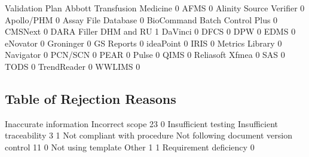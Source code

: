 \documentclass{article}
\begin{document}
\begin{Schunk}
\begin{Soutput}
                                Validation Plan
  Abbott Transfusion Medicine                 0
  AFMS                                        0
  Alinity Source Verifier                     0
  Apollo/PHM                                  0
  Assay File Database                         0
  BioCommand Batch Control Plus               0
  CMSNext                                     0
  DARA Filler DHM and RU                      1
  DaVinci                                     0
  DFCS                                        0
  DPW                                         0
  EDMS                                        0
  eNovator                                    0
  Groninger                                   0
  GS Reports                                  0
  ideaPoint                                   0
  IRIS                                        0
  Metrics Library                             0
  Navigator                                   0
  PCN/SCN                                     0
  PEAR                                        0
  Pulse                                       0
  QIMS                                        0
  Reliasoft Xfmea                             0
  SAS                                         0
  TODS                                        0
  TrendReader                                 0
  WWLIMS                                      0
\end{Soutput}
\end{Schunk}

\subsection{Table of Rejection Reasons}
\begin{Schunk}
\begin{Soutput}
                Inaccurate information                        Incorrect scope 
                                    23                                      0 
                  Insufficient testing              Insufficient traceability 
                                     3                                      1 
          Not compliant with procedure Not following document version control 
                                    11                                      0 
                    Not using template                                  Other 
                                     1                                      1 
                Requirement deficiency 
                                     0 
\end{Soutput}
\end{Schunk}
\end{document}
